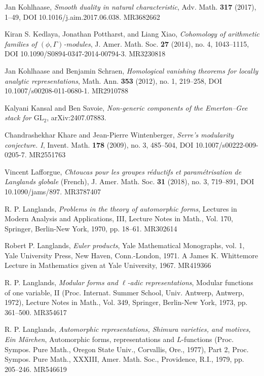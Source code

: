 \item[{[Koh17]}] Jan Kohlhaase, \emph{Smooth duality in natural characteristic}, Adv. Math. \textbf{317} (2017), 1--49, DOI 10.1016/j.aim.2017.06.038. MR3682662
\item[{[KPX14]}] Kiran S. Kedlaya, Jonathan Pottharst, and Liang Xiao, \emph{Cohomology of arithmetic families of $(\phi,\Gamma)$-modules}, J. Amer. Math. Soc. \textbf{27} (2014), no. 4, 1043--1115, DOI 10.1090/S0894-0347-2014-00794-3. MR3230818
\item[{[KS12]}] Jan Kohlhaase and Benjamin Schraen, \emph{Homological vanishing theorems for locally analytic representations}, Math. Ann. \textbf{353} (2012), no. 1, 219--258, DOI 10.1007/s00208-011-0680-1. MR2910788
\item[{[KS25]}] Kalyani Kansal and Ben Savoie, \emph{Non-generic components of the Emerton--Gee stack for $\mathrm{GL}_2$}, arXiv:2407.07883.
\item[{[KW09]}] Chandrashekhar Khare and Jean-Pierre Wintenberger, \emph{Serre's modularity conjecture. I}, Invent. Math. \textbf{178} (2009), no. 3, 485--504, DOI 10.1007/s00222-009-0205-7. MR2551763
\item[{[Laf18]}] Vincent Lafforgue, \emph{Chtoucas pour les groupes r\'eductifs et param\'etrisation de Langlands globale} (French), J. Amer. Math. Soc. \textbf{31} (2018), no. 3, 719--891, DOI 10.1090/jams/897. MR3787407
\item[{[Lan70]}] R. P. Langlands, \emph{Problems in the theory of automorphic forms}, Lectures in Modern Analysis and Applications, III, Lecture Notes in Math., Vol. 170, Springer, Berlin-New York, 1970, pp. 18--61. MR302614
\item[{[Lan71]}] Robert P. Langlands, \emph{Euler products}, Yale Mathematical Monographs, vol. 1, Yale University Press, New Haven, Conn.-London, 1971. A James K. Whittemore Lecture in Mathematics given at Yale University, 1967. MR419366
\item[{[Lan73]}] R. P. Langlands, \emph{Modular forms and $\ell$-adic representations}, Modular functions of one variable, II (Proc. Internat. Summer School, Univ. Antwerp, Antwerp, 1972), Lecture Notes in Math., Vol. 349, Springer, Berlin-New York, 1973, pp. 361--500. MR354617
\item[{[Lan79]}] R. P. Langlands, \emph{Automorphic representations, Shimura varieties, and motives, Ein M\"archen}, Automorphic forms, representations and $L$-functions (Proc. Sympos. Pure Math., Oregon State Univ., Corvallis, Ore., 1977), Part 2, Proc. Sympos. Pure Math., XXXIII, Amer. Math. Soc., Providence, R.I., 1979, pp. 205--246. MR546619

